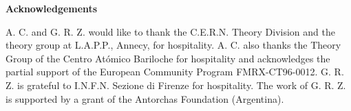 \vspace{2.cm}

{\bf Acknowledgements}

A. C. and G. R. Z. would like to thank the C.E.R.N.
Theory Division and the theory group at L.A.P.P., Annecy, for hospitality.
A. C. also thanks the Theory Group of the Centro At\'omico 
Bariloche for hospitality and acknowledges the partial
support of the European Community Program FMRX-CT96-0012.
G. R. Z. is grateful to I.N.F.N. Sezione di Firenze for hospitality. 
The work of G. R. Z. is supported by a grant of the Antorchas
Foundation (Argentina).

%
%
\def\NP{{\it Nucl. Phys.\ }}
\def\PRL{{\it Phys. Rev. Lett.\ }}
\def\PL{{\it Phys. Lett.\ }}
\def\PR{{\it Phys. Rev.\ }}
\def\CMP{{\it Comm. Math. Phys.\ }}
\def\IJMP{{\it Int. J. Mod. Phys.\ }}
\def\MPL{{\it Mod. Phys. Lett.\ }}
\def\RMP{{\it Rev. Mod. Phys.\ }}
\def\AP{{\it Ann. Phys.\ }}

